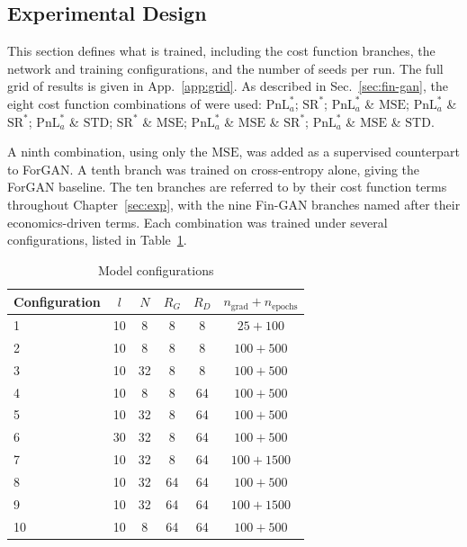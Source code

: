 \subsection{Experimental Design}\label{sec:configurations}
This section defines what is trained, including the cost function branches, the network and training configurations, and the number of seeds per run. The full grid of results is given in App.~\ref{app:grid}. As described in Sec.~\ref{sec:fin-gan}, the eight cost function combinations of \textcite{vuleticFinGANForecastingClassifying2024} were used:
$\mathrm{PnL}^{*}_{a}$;
$\mathrm{SR}^{*}$;
$\mathrm{PnL}^{*}_{a}$ \& $\mathrm{MSE}$;
$\mathrm{PnL}^{*}_{a}$ \& $\mathrm{SR}^{*}$;
$\mathrm{PnL}^{*}_{a}$ \& $\mathrm{STD}$;
$\mathrm{SR}^{*}$ \& $\mathrm{MSE}$;
$\mathrm{PnL}^{*}_{a}$ \& $\mathrm{MSE}$ \& $\mathrm{SR}^{*}$;
$\mathrm{PnL}^{*}_{a}$ \& $\mathrm{MSE}$ \& $\mathrm{STD}$. 

A ninth combination, using only the $\mathrm{MSE}$, was added as a supervised counterpart to ForGAN. A tenth branch was trained on cross-entropy alone, giving the ForGAN baseline. The ten branches are referred to by their cost function terms throughout Chapter~\ref{sec:exp}, with the nine Fin-GAN branches named after their economics-driven terms. Each combination was trained under several configurations, listed in Table~\ref{tab:configurations}. 

\begin{table}[H]
\centering
\begin{tabular}{lccccc}
\toprule
Configuration & $l$ & $N$ & $R_G$ & $R_D$ & $n_{\text{grad}} + n_{\text{epochs}}$ \\
\midrule
1  & 10 & 8  & 8  & 8  & $25 + 100$   \\
2  & 10 & 8  & 8  & 8  & $100 + 500$  \\
3  & 10 & 32 & 8  & 8  & $100 + 500$  \\
4  & 10 & 8  & 8  & 64 & $100 + 500$  \\
5  & 10 & 32 & 8  & 64 & $100 + 500$  \\
6  & 30 & 32 & 8  & 64 & $100 + 500$  \\
7  & 10 & 32 & 8  & 64 & $100 + 1500$ \\
8  & 10 & 32 & 64 & 64 & $100 + 500$  \\
9  & 10 & 32 & 64 & 64 & $100 + 1500$ \\
10 & 10 & 8  & 64 & 64 & $100 + 500$  \\
\bottomrule
\end{tabular}
\caption{Model configurations}
\label{tab:configurations}
\end{table}

